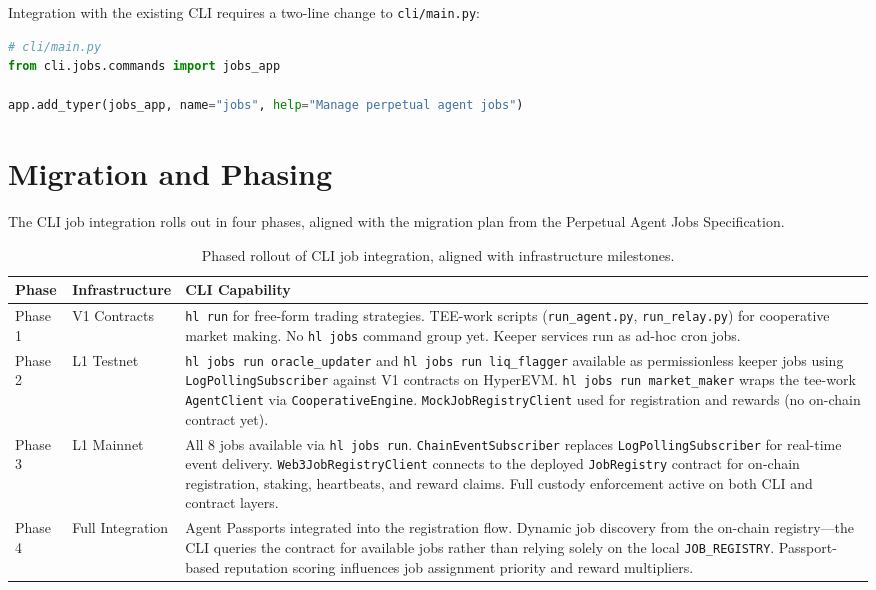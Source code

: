 \documentclass[11pt,a4paper]{article}
\begin{document}
Integration with the existing CLI requires a two-line change to \texttt{cli/main.py}:

\begin{lstlisting}[language=Python]
# cli/main.py
from cli.jobs.commands import jobs_app

app.add_typer(jobs_app, name="jobs", help="Manage perpetual agent jobs")
\end{lstlisting}

\section{Migration and Phasing}

The CLI job integration rolls out in four phases, aligned with the migration plan
from the Perpetual Agent Jobs Specification.

\begin{table}[H]
\centering
\small
\begin{tabularx}{\textwidth}{l l X}
\toprule
\textbf{Phase} & \textbf{Infrastructure} & \textbf{CLI Capability} \\
\midrule
\rowcolor{gray!10}
Phase 1 & V1 Contracts &
\texttt{hl run} for free-form trading strategies. TEE-work scripts
(\texttt{run\_agent.py}, \texttt{run\_relay.py}) for cooperative market making.
No \texttt{hl jobs} command group yet. Keeper services run as ad-hoc cron jobs. \\
\rowcolor{info!10}
Phase 2 & L1 Testnet &
\texttt{hl jobs run oracle\_updater} and \texttt{hl jobs run liq\_flagger}
available as permissionless keeper jobs using \texttt{LogPollingSubscriber}
against V1 contracts on HyperEVM. \texttt{hl jobs run market\_maker} wraps
the tee-work \texttt{AgentClient} via \texttt{CooperativeEngine}.
\texttt{MockJobRegistryClient} used for registration and rewards (no on-chain
contract yet). \\
\rowcolor{success!10}
Phase 3 & L1 Mainnet &
All 8 jobs available via \texttt{hl jobs run}. \texttt{ChainEventSubscriber}
replaces \texttt{LogPollingSubscriber} for real-time event delivery.
\texttt{Web3JobRegistryClient} connects to the deployed \texttt{JobRegistry}
contract for on-chain registration, staking, heartbeats, and reward claims.
Full custody enforcement active on both CLI and contract layers. \\
\rowcolor{cooperative!8}
Phase 4 & Full Integration &
Agent Passports integrated into the registration flow. Dynamic job discovery
from the on-chain registry---the CLI queries the contract for available jobs
rather than relying solely on the local \texttt{JOB\_REGISTRY}. Passport-based
reputation scoring influences job assignment priority and reward multipliers. \\
\bottomrule
\end{tabularx}
\caption{Phased rollout of CLI job integration, aligned with infrastructure milestones.}
\end{table}
\end{document}
